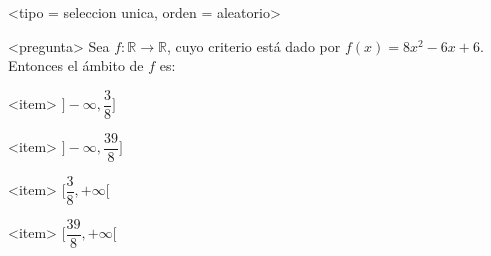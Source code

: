 <tipo = seleccion unica, orden = aleatorio>

<pregunta>
Sea $f:\mathbb R \to \mathbb R$, cuyo criterio est\'a dado por $f(x) = 8x^2 -6x +6$. Entonces el \'ambito de $f$ es:


<item>
$\bigg]{-}\infty, \dfrac{3}{8}\bigg]$

<item>
$\bigg]{-}\infty, \dfrac{39}{8}\bigg]$

<item>
$\bigg[\dfrac{3}{8}, +\infty\bigg[$

<item>
$\bigg[\dfrac{39}{8}, +\infty\bigg[$



